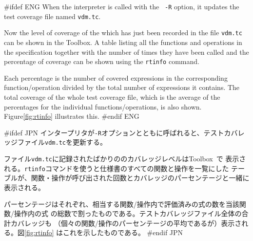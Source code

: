 \documentclass[\pformat,12pt]{article}
\newcommand{\Toolbox}{Toolbox}
\newcommand{\Toolbox}{Toolbox}
\newcommand{\cmd}{\tt }
\begin{document}
#ifdef ENG
When the interpreter is called with the {\tt 
-R} option, it updates the test coverage file named {\tt vdm.tc}.

Now the level of coverage of the  which has just been recorded in
  the file {\tt vdm.tc} can be shown in the \Toolbox.  A
table listing all the functions and operations in the specification
together with the number of times they have been called and the
percentage of coverage can be shown using the {\cmd rtinfo} command.

Each percentage is the number of covered expressions in the
  corresponding function/operation 
divided by the total number of expressions it contains.  The total
coverage of the whole test coverage file, which is the average of the
percentages for the individual functions/operations, is also
shown. Figure\ref{fig:rtinfo} illustrates this.
#endif ENG

#ifdef JPN
インタープリタが{\tt -R}オプションとともに呼ばれると、テストカバレッジファイル{\tt vdm.tc}を更新する。

ファイル{\tt vdm.tc}に記録されたばかりののカバレッジレベルは\Toolbox\ で
表示される。{\cmd rtinfo}コマンドを使うと仕様書のすべての関数と操作を一覧にした
テーブルが、関数・操作が呼び出された回数とカバレッジのパーセンテージと一緒に
表示される。

パーセンテージはそれぞれ、相当する関数/操作内で評価済みの式の数を当該関数/操作内の式
の総数で割ったものである。テストカバレッジファイル全体の合計カバレッジも
（個々の関数/操作のパーセンテージの平均であるが）表示される。図\ref{fig:rtinfo} 
はこれを示したものである。
#endif JPN
\end{document}
